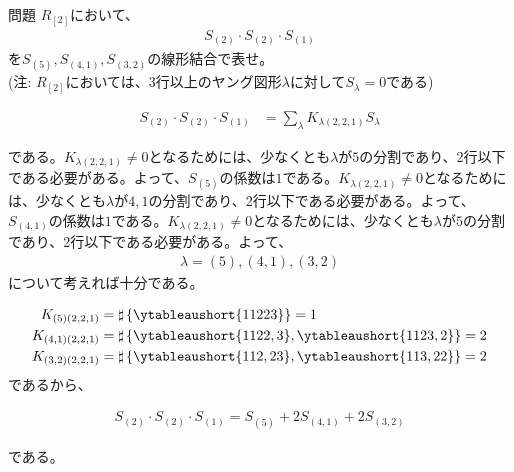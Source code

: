 \documentclass[a4paper,11pt]{jsarticle}
\theoremstyle{plain}
\theoremstyle{definition}
\renewcommand{\(}{\left(}
\renewcommand{\)}{\right)}
\renewcommand{\[}{\left[}
\renewcommand{\]}{\right]}
\renewcommand{\{}{\left\lbrace}
\renewcommand{\}}{\right\rbrace}
\begin{document}
\begin{itembox}[l]{問題}
    $R_{[2]}$において、
    \begin{align*}
        S_{(2)} \cdot S_{(2)} \cdot S_{(1)}
    \end{align*}
    を$S_{(5)}, S_{(4,1)}, S_{(3,2)}$の線形結合で表せ。\\
    (注: $R_{[2]}$においては、3行以上のヤング図形$\lambda$に対して$S_{\lambda} = 0$である)
\end{itembox}


\begin{align*}
    S_{(2)} \cdot S_{(2)} \cdot S_{(1)} &= \sum_{\lambda} K_{\lambda (2,2,1)} S_{\lambda}
\end{align*}

である。$K_{\lambda (2,2,1)} \neq 0$となるためには、少なくとも$\lambda$が$5$の分割であり、2行以下である必要がある。よって、$S_{(5)}$の係数は$1$である。$K_{\lambda (2,2,1)} \neq 0$となるためには、少なくとも$\lambda$が$4,1$の分割であり、2行以下である必要がある。よって、$S_{(4,1)}$の係数は$1$である。$K_{\lambda (2,2,1)} \neq 0$となるためには、少なくとも$\lambda$が$5$の分割であり、2行以下である必要がある。よって、
\begin{align*}
    \lambda = (5), (4,1), (3,2)
\end{align*}
について考えれば十分である。

\begin{align*}
    K_{(5) (2,2,1)} &= \sharp \{
        \ytableaushort{11223}
    \} = 1 \\
    K_{(4,1) (2,2,1)} &= \sharp \{
        \ytableaushort{1122,3}, \ytableaushort{1123,2}
    \} = 2 \\
    K_{(3,2) (2,2,1)} &= \sharp \{
        \ytableaushort{112,23}, \ytableaushort{113,22}
    \} = 2
\end{align*}
であるから、

\begin{align*}
    S_{(2)} \cdot S_{(2)} \cdot S_{(1)} = S_{(5)} + 2S_{(4,1)} + 2S_{(3,2)}
\end{align*}

である。
\end{document}
